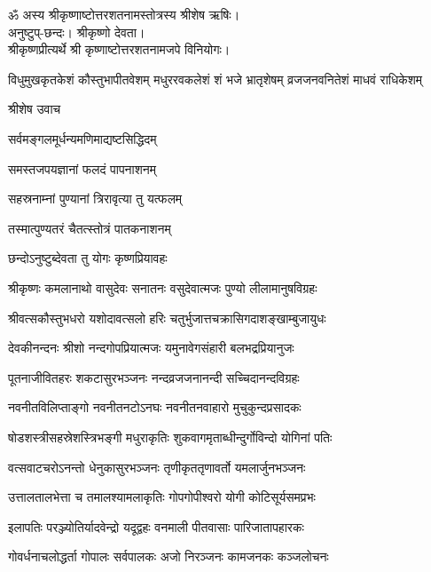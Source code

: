 ॐ अस्य श्रीकृष्णाष्टोत्तरशतनामस्तोत्रस्य श्रीशेष ऋषिः।\\
अनुष्टुप्-छन्दः। श्रीकृष्णो देवता।\\
 श्रीकृष्णप्रीत्यर्थे श्री कृष्णाष्टोत्तरशतनामजपे विनियोगः।

{विधुमुखकृतकेशं कौस्तुभापीतवेशम्}
{मधुररवकलेशं शं भजे भ्रातृशेषम्}
{व्रजजनवनितेशं माधवं राधिकेशम्}

{श्रीशेष उवाच}

{सर्वमङ्गलमूर्धन्यमणिमाद्यष्टसिद्धिदम्}

{समस्तजपयज्ञानां फलदं पापनाशनम्}

{सहस्रनाम्नां पुण्यानां त्रिरावृत्या तु यत्फलम्}

{तस्मात्पुण्यतरं चैतत्स्तोत्रं पातकनाशनम्}

{छन्दोऽनुष्टुब्देवता तु योगः कृष्णप्रियावहः}

\twolineshloka
{श्रीकृष्णः कमलानाथो वासुदेवः सनातनः}
{वसुदेवात्मजः पुण्यो लीलामानुषविग्रहः}

\twolineshloka
{श्रीवत्सकौस्तुभधरो यशोदावत्सलो हरिः}
{चतुर्भुजात्तचक्रासिगदाशङ्खाम्बुजायुधः}

\twolineshloka
{देवकीनन्दनः श्रीशो नन्दगोपप्रियात्मजः}
{यमुनावेगसंहारी बलभद्रप्रियानुजः}

\twolineshloka
{पूतनाजीवितहरः शकटासुरभञ्जनः}
{नन्दव्रजजनानन्दी सच्चिदानन्दविग्रहः}

\twolineshloka
{नवनीतविलिप्ताङ्गो नवनीतनटोऽनघः}
{नवनीतनवाहारो मुचुकुन्दप्रसादकः}

\twolineshloka
{षोडशस्त्रीसहस्रेशस्त्रिभङ्गी मधुराकृतिः}
{शुकवागमृताब्धीन्दुर्गोविन्दो योगिनां पतिः}

\twolineshloka
{वत्सवाटचरोऽनन्तो धेनुकासुरभञ्जनः}
{तृणीकृततृणावर्तो यमलार्जुनभञ्जनः}

\twolineshloka
{उत्तालतालभेत्ता च तमालश्यामलाकृतिः}
{गोपगोपीश्वरो योगी कोटिसूर्यसमप्रभः}

\twolineshloka
{इलापतिः परञ्ज्योतिर्यादवेन्द्रो यदूद्वहः}
{वनमाली पीतवासाः पारिजातापहारकः}

\twolineshloka
{गोवर्धनाचलोद्धर्ता गोपालः सर्वपालकः}
{अजो निरञ्जनः कामजनकः कञ्जलोचनः}

